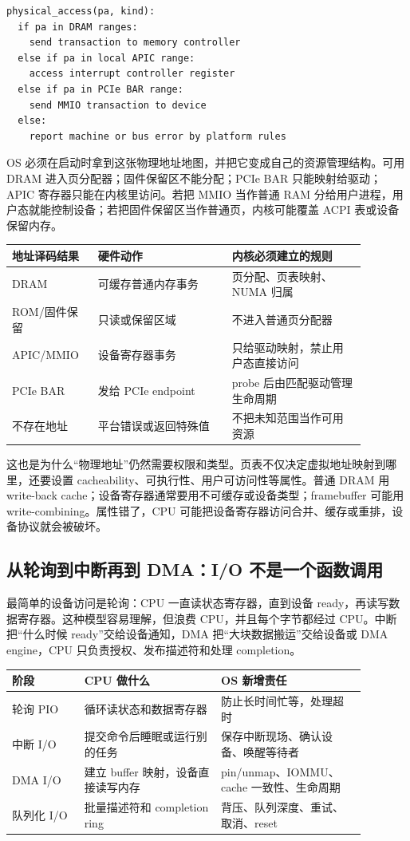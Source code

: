 \begin{lstlisting}
physical_access(pa, kind):
  if pa in DRAM ranges:
    send transaction to memory controller
  else if pa in local APIC range:
    access interrupt controller register
  else if pa in PCIe BAR range:
    send MMIO transaction to device
  else:
    report machine or bus error by platform rules
\end{lstlisting}

OS 必须在启动时拿到这张物理地址地图，并把它变成自己的资源管理结构。可用 DRAM 进入页分配器；固件保留区不能分配；PCIe BAR 只能映射给驱动；APIC 寄存器只能在内核里访问。若把 MMIO 当作普通 RAM 分给用户进程，用户态就能控制设备；若把固件保留区当作普通页，内核可能覆盖 ACPI 表或设备保留内存。

\begin{longtable}{p{0.2\linewidth}p{0.34\linewidth}p{0.34\linewidth}}
\toprule
地址译码结果 & 硬件动作 & 内核必须建立的规则 \\
\midrule
DRAM & 可缓存普通内存事务 & 页分配、页表映射、NUMA 归属 \\
ROM/固件保留 & 只读或保留区域 & 不进入普通页分配器 \\
APIC/MMIO & 设备寄存器事务 & 只给驱动映射，禁止用户态直接访问 \\
PCIe BAR & 发给 PCIe endpoint & probe 后由匹配驱动管理生命周期 \\
不存在地址 & 平台错误或返回特殊值 & 不把未知范围当作可用资源 \\
\bottomrule
\end{longtable}

这也是为什么“物理地址”仍然需要权限和类型。页表不仅决定虚拟地址映射到哪里，还要设置 cacheability、可执行性、用户可访问性等属性。普通 DRAM 用 write-back cache；设备寄存器通常要用不可缓存或设备类型；framebuffer 可能用 write-combining。属性错了，CPU 可能把设备寄存器访问合并、缓存或重排，设备协议就会被破坏。

\subsection{从轮询到中断再到 DMA：I/O 不是一个函数调用}

最简单的设备访问是轮询：CPU 一直读状态寄存器，直到设备 ready，再读写数据寄存器。这种模型容易理解，但浪费 CPU，并且每个字节都经过 CPU。中断把“什么时候 ready”交给设备通知，DMA 把“大块数据搬运”交给设备或 DMA engine，CPU 只负责授权、发布描述符和处理 completion。

\begin{longtable}{p{0.18\linewidth}p{0.34\linewidth}p{0.36\linewidth}}
\toprule
阶段 & CPU 做什么 & OS 新增责任 \\
\midrule
轮询 PIO & 循环读状态和数据寄存器 & 防止长时间忙等，处理超时 \\
中断 I/O & 提交命令后睡眠或运行别的任务 & 保存中断现场、确认设备、唤醒等待者 \\
DMA I/O & 建立 buffer 映射，设备直接读写内存 & pin/unmap、IOMMU、cache 一致性、生命周期 \\
队列化 I/O & 批量描述符和 completion ring & 背压、队列深度、重试、取消、reset \\
\bottomrule
\end{longtable}


